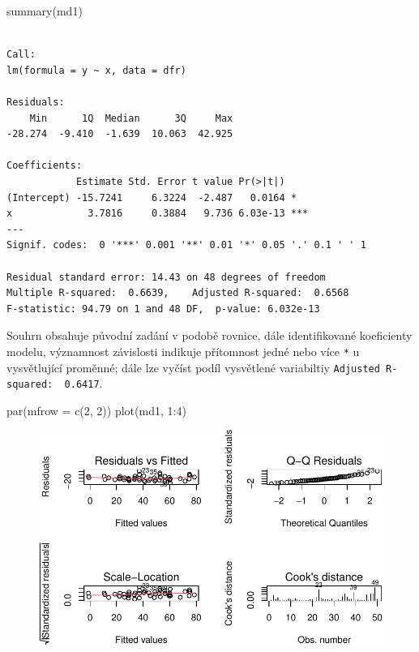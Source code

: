 \documentclass[
  letterpaper,
  DIV=11,
  numbers=noendperiod]{scrreprt}
\newenvironment{Shaded}{\begin{snugshade}}{\end{snugshade}}
\newcommand{\AttributeTok}[1]{\textcolor[rgb]{0.40,0.45,0.13}{#1}}
\newcommand{\DecValTok}[1]{\textcolor[rgb]{0.68,0.00,0.00}{#1}}
\newcommand{\FunctionTok}[1]{\textcolor[rgb]{0.28,0.35,0.67}{#1}}
\newcommand{\NormalTok}[1]{\textcolor[rgb]{0.00,0.23,0.31}{#1}}
\newcommand{\SpecialCharTok}[1]{\textcolor[rgb]{0.37,0.37,0.37}{#1}}
\begin{document}
\begin{Shaded}
\begin{Highlighting}[]
\FunctionTok{summary}\NormalTok{(md1)}
\end{Highlighting}
\end{Shaded}

\begin{verbatim}

Call:
lm(formula = y ~ x, data = dfr)

Residuals:
    Min      1Q  Median      3Q     Max 
-28.274  -9.410  -1.639  10.063  42.925 

Coefficients:
            Estimate Std. Error t value Pr(>|t|)    
(Intercept) -15.7241     6.3224  -2.487   0.0164 *  
x             3.7816     0.3884   9.736 6.03e-13 ***
---
Signif. codes:  0 '***' 0.001 '**' 0.01 '*' 0.05 '.' 0.1 ' ' 1

Residual standard error: 14.43 on 48 degrees of freedom
Multiple R-squared:  0.6639,    Adjusted R-squared:  0.6568 
F-statistic: 94.79 on 1 and 48 DF,  p-value: 6.032e-13
\end{verbatim}

Souhrn obsahuje původní zadání v podobě rovnice, dále identifikované
koeficienty modelu, významnost závislosti indikuje přítomnost jedné nebo
více \texttt{*} u vysvětlující proměnné; dále lze vyčíst podíl
vysvětlené variabiltiy \texttt{Adjusted\ R-squared:\ \ 0.6417}.\\

\begin{Shaded}
\begin{Highlighting}[]
\FunctionTok{par}\NormalTok{(}\AttributeTok{mfrow =} \FunctionTok{c}\NormalTok{(}\DecValTok{2}\NormalTok{, }\DecValTok{2}\NormalTok{))}
\FunctionTok{plot}\NormalTok{(md1, }\DecValTok{1}\SpecialCharTok{:}\DecValTok{4}\NormalTok{)}
\end{Highlighting}
\end{Shaded}

\begin{figure}[H]

{\centering \includegraphics{12_extremalni_rozdeleni_files/figure-pdf/unnamed-chunk-9-1.pdf}

}

\end{figure}
\end{document}
